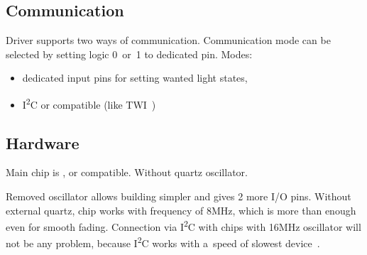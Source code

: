
\subsection{Communication}
Driver supports two ways of communication. Communication mode can be selected by setting logic 0~or~1 to dedicated pin.
\newline
Modes:
\begin{itemize}
	\item dedicated input pins for setting wanted light states,
	\item I\textsuperscript{2}C or compatible (like TWI~\cite{i2c-twi})
\end{itemize}


\subsection{Hardware}
Main chip is , or compatible. Without quartz oscillator.

Removed oscillator allows building simpler and gives 2 more I/O pins. Without external quartz, chip works with frequency of 8MHz, which is more than enough
even for smooth fading. Connection via I\textsuperscript{2}C with chips with 16MHz oscillator will not be any problem, because I\textsuperscript{2}C works
with a~speed of slowest device~\cite{i2cspeed}.
